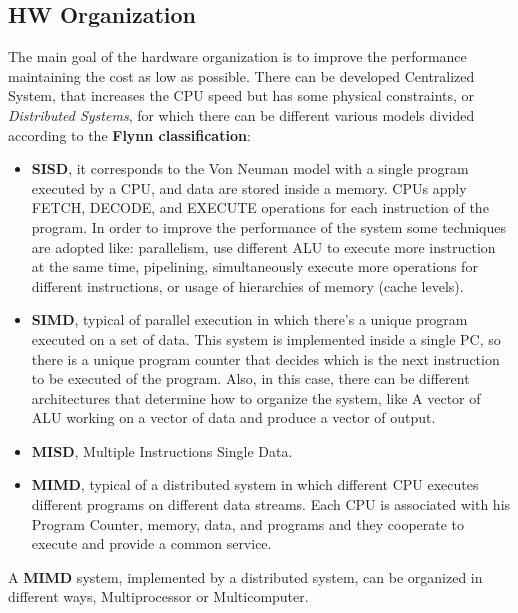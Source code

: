 \documentclass[11pt,a4paper]{article}
\begin{document}
\subsection{HW Organization}
The main goal of the hardware organization is to improve the performance maintaining the cost as low as possible. There can be developed Centralized System, that increases the CPU speed but has some physical constraints, or \textit{Distributed Systems}, for which there can be different various models divided according to the \textbf{Flynn classification}:
\begin{itemize}
    \item \textbf{SISD}, it corresponds to the Von Neuman model with a single program executed by a CPU, and data are stored inside a memory. CPUs apply FETCH, DECODE, and EXECUTE operations for each instruction of the program. In order to improve the performance of the system some techniques are adopted like: parallelism, use different ALU to execute more instruction at the same time, pipelining, simultaneously execute more operations for different instructions, or usage of hierarchies of memory (cache levels).
    \item \textbf{SIMD}, typical of parallel execution in which there's a unique program executed on a set of data. This system is implemented inside a single PC, so there is a unique program counter that decides which is the next instruction to be executed of the program. Also, in this case, there can be different architectures that determine how to organize the system, like A vector of ALU working on a vector of data and produce a vector of output.
    \item \textbf{MISD}, Multiple Instructions Single Data.
    \item \textbf{MIMD}, typical of a distributed system in which different CPU executes different programs on different data streams. Each CPU is associated with his Program Counter, memory, data, and programs and they cooperate to execute and provide a common service.
\end{itemize}

A \textbf{MIMD} system, implemented by a distributed system, can be organized in different ways, Multiprocessor or Multicomputer.
\end{document}
